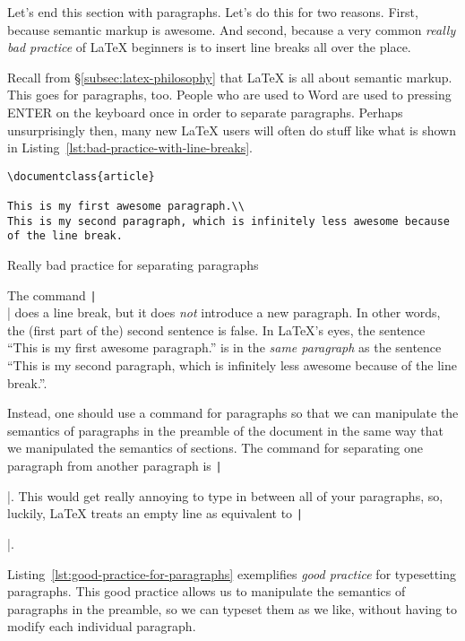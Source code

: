 Let's end this section with paragraphs.
Let's do this for two reasons.
First, because semantic markup is awesome.
And second, because a very common \emph{really bad practice} of \LaTeX{} beginners is to insert line breaks all over the place.

Recall from \S\ref{subsec:latex-philosophy} that \LaTeX{} is all about semantic markup.
This goes for paragraphs, too.
People who are used to Word are used to pressing ENTER on the keyboard once in order to separate paragraphs.
Perhaps unsurprisingly then, many new \LaTeX{} users will often do stuff like what is shown in Listing~\ref{lst:bad-practice-with-line-breaks}.

\begin{listing}[htbp]
	\centering
	\begin{verbatim}
\documentclass{article}

This is my first awesome paragraph.\\
This is my second paragraph, which is infinitely less awesome because of the line break.

	\end{verbatim}
	\caption{Really bad practice for separating paragraphs}
	\label{lst:bad-practice-with-line-breaks}
\end{listing}

The command \texttt|\\| does a line break, but it does \emph{not} introduce a new paragraph.
In other words, the (first part of the) second sentence is false.
In \LaTeX{}'s eyes, the sentence ``This is my first awesome paragraph.'' is in the \emph{same paragraph} as the sentence ``This is my second paragraph, which is infinitely less awesome because of the line break.''.

Instead, one should use a command for paragraphs so that we can manipulate the semantics of paragraphs in the preamble of the document in the same way that we manipulated the semantics of sections.
The command for separating one paragraph from another paragraph is \texttt|\par|.
This would get really annoying to type in between all of your paragraphs, so, luckily, \LaTeX{} treats an empty line as equivalent to \texttt|\par|.

Listing~\ref{lst:good-practice-for-paragraphs} exemplifies \emph{good practice} for typesetting paragraphs.
This good practice allows us to manipulate the semantics of paragraphs in the preamble, so we can typeset them as we like, without having to modify each individual paragraph.

